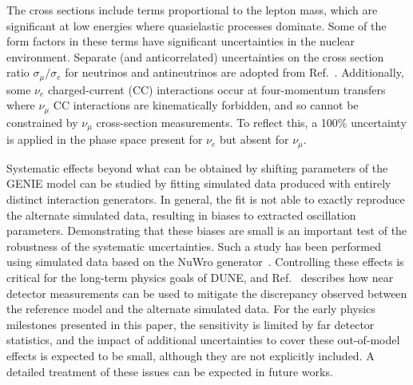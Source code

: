 The cross sections include terms proportional to the lepton mass, which are significant at low energies where quasielastic processes dominate. Some of the form factors in these terms have significant uncertainties in the nuclear environment. Separate (and anticorrelated) uncertainties on the cross section ratio $\sigma_\mu/\sigma_e$ for neutrinos and antineutrinos are adopted from Ref.~\cite{Day:2012gb}. Additionally, some $\nu_e$ charged-current (CC) interactions occur at four-momentum transfers where $\nu_\mu$ CC interactions are kinematically forbidden, and so cannot be constrained by $\nu_\mu$ cross-section measurements. To reflect this, a 100\% uncertainty is applied in the phase space present for $\nu_e$ but absent for $\nu_\mu$.

Systematic effects beyond what can be obtained by shifting parameters of the GENIE model can be studied by fitting simulated data produced with entirely distinct interaction generators. In general, the fit is not able to exactly reproduce the alternate simulated data, resulting in biases to extracted oscillation parameters. Demonstrating that these biases are small is an important test of the robustness of the systematic uncertainties. Such a study has been performed using simulated data based on the NuWro generator~\cite{NuWro2012}. Controlling these effects is critical for the long-term physics goals of DUNE, and Ref.~\cite{AbedAbud:2021hpb} describes how near detector measurements can be used to mitigate the discrepancy observed between the reference model and the alternate simulated data. For the early physics milestones presented in this paper, the sensitivity is limited by far detector statistics, and the impact of additional uncertainties to cover these out-of-model effects is expected to be small, although they are not explicitly included. A detailed treatment of these issues can be expected in future works.

